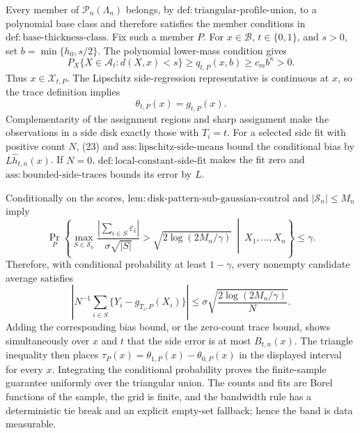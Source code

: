 Every member of \(\mathcal P_n(\Lambda_n)\) belongs, by \(\mathrm{def:triangular\text{-}profile\text{-}union}\), to a polynomial base class and therefore satisfies the member conditions in \(\mathrm{def:base\text{-}thickness\text{-}class}\). Fix such a member \(P\). For \(x\in\mathcal B\), \(t\in\{0,1\}\), and \(s>0\), set \(b=\min\{h_0,s/2\}\). The polynomial lower-mass condition gives
\[
 P_X\{X\in\mathcal A_t:d(X,x)<s\}
 \ge q_{t,P}(x,b)\ge c_mb^\kappa>0. \tag{22}
\]
Thus \(x\in\mathcal X_{t,P}\). The Lipschitz side-regression representative is continuous at \(x\), so the trace definition implies
\[
 \theta_{t,P}(x)=g_{t,P}(x). \tag{23}
\]
Complementarity of the assignment regions and sharp assignment make the observations in a side disk exactly those with \(T_i=t\). For a selected side fit with positive count \(N\), (23) and \(\mathrm{ass:lipschitz\text{-}side\text{-}means}\) bound the conditional bias by \(L\widehat h_{t,n}(x)\). If \(N=0\), \(\mathrm{def:local\text{-}constant\text{-}side\text{-}fit}\) makes the fit zero and \(\mathrm{ass:bounded\text{-}side\text{-}traces}\) bounds its error by \(L\).

Conditionally on the scores, \(\mathrm{lem:disk\text{-}pattern\text{-}sub\text{-}gaussian\text{-}control}\) and \(|\mathscr S_n|\le M_n\) imply
\[
 \Pr_P\left\{\max_{S\in\mathscr S_n}
 \frac{|\sum_{i\in S}\varepsilon_i|}{\sigma\sqrt{|S|}}
 >\sqrt{2\log(2M_n/\gamma)}
 \ \middle|\ X_1,\ldots,X_n\right\}\le\gamma. \tag{24}
\]
Therefore, with conditional probability at least \(1-\gamma\), every nonempty candidate average satisfies
\[
 \left|N^{-1}\sum_{i\in S}\{Y_i-g_{T_i,P}(X_i)\}\right|
 \le\sigma\sqrt{\frac{2\log(2M_n/\gamma)}N}. \tag{25}
\]
Adding the corresponding bias bound, or the zero-count trace bound, shows simultaneously over \(x\) and \(t\) that the side error is at most \(B_{t,n}(x)\). The triangle inequality then places \(\tau_P(x)=\theta_{1,P}(x)-\theta_{0,P}(x)\) in the displayed interval for every \(x\). Integrating the conditional probability proves the finite-sample guarantee uniformly over the triangular union. The counts and fits are Borel functions of the sample, the grid is finite, and the bandwidth rule has a deterministic tie break and an explicit empty-set fallback; hence the band is data measurable.

